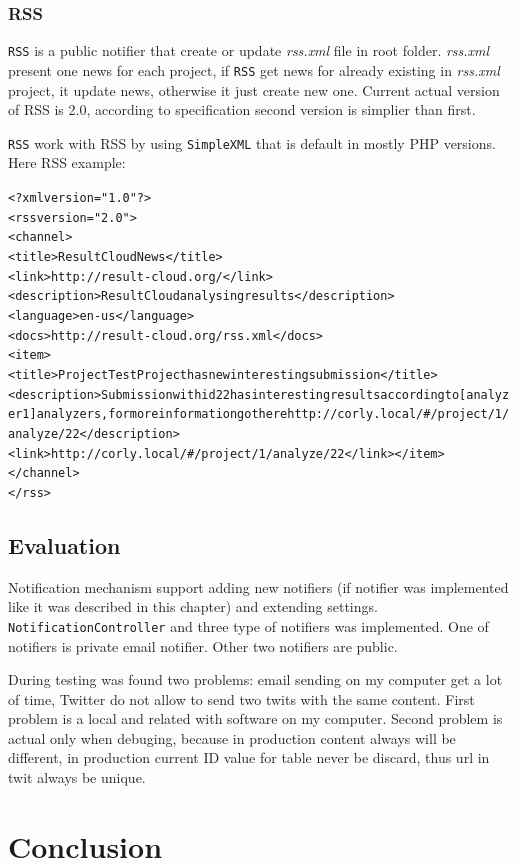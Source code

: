 \subsection{RSS}

\texttt{RSS} is a public notifier that create or update \emph{rss.xml} file in root folder. \emph{rss.xml} present one news for each project, if \texttt{RSS} get news for already existing in \emph{rss.xml} project, it update news, otherwise it just create new one. Current actual version of RSS is 2.0, according to specification \cite{rss} second version is simplier than first.

\texttt{RSS} work with RSS by using \texttt{SimpleXML} that is default in mostly PHP versions. Here RSS example:
\begin{alltt}
<?xml version="1.0"?>
<rss version="2.0"> 
<channel>
<title>ResultCloud News</title>
<link>http://result-cloud.org/</link>
<description>ResultCloud analysing results</description>
<language>en-us</language>
<docs>http://result-cloud.org/rss.xml</docs>
<item>
<title>Project TestProject has new interesting submission</title>
<description>Submission with id 22 has interesting results according to [analyzer1] analyzers, for more information go there http://corly.local/#/project/1/analyze/22</description>
<link>http://corly.local/#/project/1/analyze/22</link></item>
</channel>
</rss>

\end{alltt}

\section{Evaluation}

Notification mechanism support adding new notifiers (if notifier was implemented like it was described in this chapter) and extending settings. \texttt{NotificationController} and three type of notifiers was implemented. One of notifiers is private email notifier. Other two notifiers are public.

During testing was found two problems: email sending on my computer get a lot of time, Twitter do not allow to send two twits with the same content. First problem is a local and related with software on my computer. Second problem is actual only when debuging, because in production content always will be different, in production current ID value for table never be discard, thus url in twit always be unique. 

\chapter{Conclusion}
\label{ch:conclusion}

